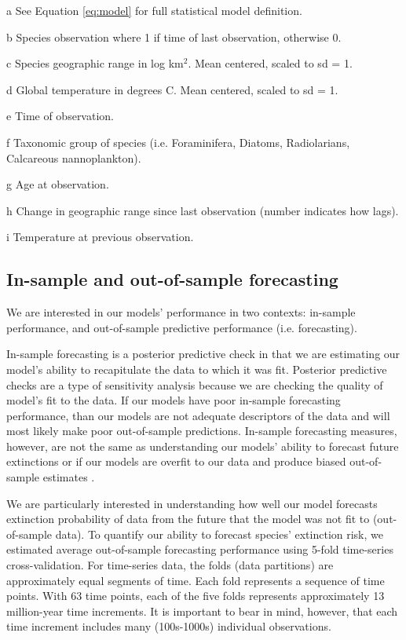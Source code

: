 \documentclass[12pt,letterpaper]{article}
\begin{document}
\begin{refsection}
\begin{table}[ht]
\begin{threeparttable}
{\begin{tabular}{ l p{3cm} l l }
    \hline
   \end{tabular}
  }
  \begin{tablenotes}
  \item[a] See Equation \ref{eq:model} for full statistical model definition.
  \item[b] Species observation where 1 if time of last observation, otherwise 0.
  \item[c] Species geographic range in log km\(^2\). Mean centered, scaled to sd = 1.
  \item[d] Global temperature in degrees C. Mean centered, scaled to sd = 1.
  \item[e] Time of observation.
  \item[f] Taxonomic group of species (i.e. Foraminifera, Diatoms, Radiolarians, Calcareous nannoplankton).
  \item[g] Age at observation.
  \item[h] Change in geographic range since last observation (number indicates how lags).
  \item[i] Temperature at previous observation.
  \end{tablenotes}
 \end{threeparttable}
 \label{tab:model_def}
\end{table}


\subsection{In-sample and out-of-sample forecasting}

We are interested in our models' performance in two contexts: in-sample performance, and out-of-sample predictive performance (i.e. forecasting). 

In-sample forecasting is a posterior predictive check in that we are estimating our model's ability to recapitulate the data to which it was fit. Posterior predictive checks are a type of sensitivity analysis because we are checking the quality of model's fit to the data. If our models have poor in-sample forecasting performance, than our models are not adequate descriptors of the data and will most likely make poor out-of-sample predictions. In-sample forecasting measures, however, are not the same as understanding our models' ability to forecast future extinctions or if our models are overfit to our data and produce biased out-of-sample estimates \citep{ESL}. 

We are particularly interested in understanding how well our model forecasts extinction probability of data from the future that the model was not fit to (out-of-sample data). To quantify our ability to forecast species' extinction risk, we estimated average out-of-sample forecasting performance using 5-fold time-series cross-validation. For time-series data, the folds (data partitions) are approximately equal segments of time. Each fold represents a sequence of time points. With 63 time points, each of the five folds represents approximately 13 million-year time increments. It is important to bear in mind, however, that each time increment includes many (100s-1000s) individual observations.


\end{refsection}
\end{document}
